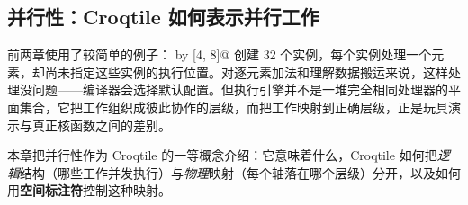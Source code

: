 \subsection*{并行性：Croqtile 如何表示并行工作}

前两章使用了较简单的例子： by [4, 8]@ 创建 32 个实例，每个实例处理一个元素，却尚未指定这些实例的执行位置。对逐元素加法和理解数据搬运来说，这样处理没问题——编译器会选择默认配置。但执行引擎并不是一堆完全相同处理器的平面集合，它把工作组织成彼此协作的层级，而把工作映射到正确层级，正是玩具演示与真正核函数之间的差别。

本章把并行性作为 Croqtile 的一等概念介绍：它意味着什么，Croqtile 如何把\emph{逻辑}结构（哪些工作并发执行）与\emph{物理}映射（每个轴落在哪个层级）分开，以及如何用\textbf{空间标注符}控制这种映射。
